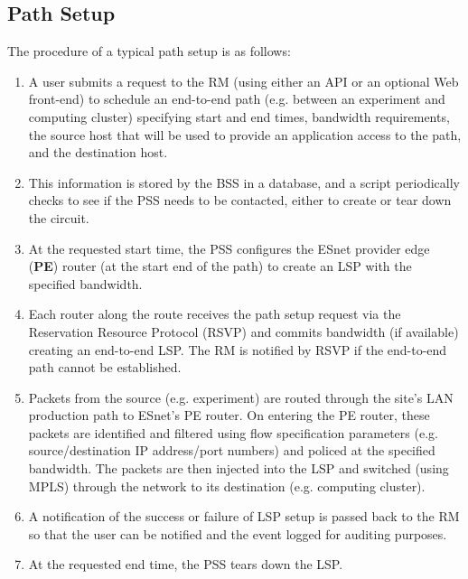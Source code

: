 \documentclass[conference]{IEEEtran}
\begin{document}
\subsection{Path Setup}

The procedure of a typical path setup is as follows:

\begin{enumerate}
\item
A user submits a request to the RM (using either an API or
an optional Web front-end) to schedule an end-to-end path (e.g. between an
experiment and computing cluster) specifying start and end times, bandwidth
requirements, the source host that will be used 
to provide an application access to the path, and the destination host.

\item
This information is stored by the BSS in a database, and a script 
periodically checks to see if the PSS needs to be contacted, either to create 
or tear down the circuit.

\item
At the requested start time, the PSS configures the 
ESnet provider edge (\textbf{PE}) router
(at the start end of the path) to create an LSP with the
specified bandwidth.

\item
Each router along the route receives the path setup request 
via the Reservation Resource Protocol (RSVP) \cite{rsvp}
and commits bandwidth (if available) creating an end-to-end LSP.  The RM is
notified by RSVP if the end-to-end path cannot be established.

\item
Packets from the source (e.g. experiment) are routed through the site's
LAN production path to ESnet's PE router.  On entering the PE router,
these packets are identified and filtered using flow specification parameters
(e.g. source/destination IP address/port numbers) and policed at the specified
bandwidth.  The packets are then injected into the LSP and switched (using MPLS)
through the network to its destination (e.g. computing cluster).

\item
A notification of the success or failure of LSP setup is 
passed back to the RM so that the user can be notified and the event 
logged for auditing purposes.

\item
At the requested end time, the PSS tears down the LSP.
\end{enumerate}
\end{document}
